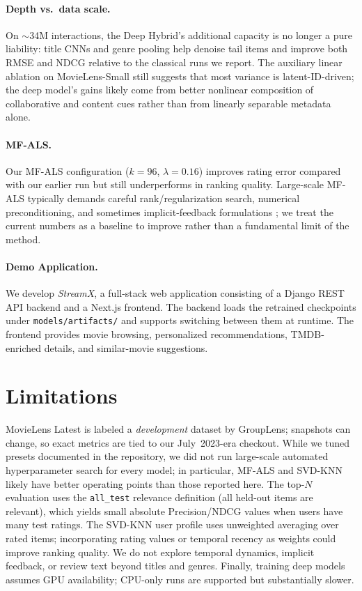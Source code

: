 \documentclass[11pt]{article}
\begin{document}
\paragraph{Depth vs.\ data scale.}
On $\sim$34M interactions, the Deep Hybrid's additional capacity is no longer a pure liability: title CNNs and genre pooling help denoise tail items and improve both RMSE and NDCG relative to the classical runs we report.
The auxiliary linear ablation on MovieLens-Small still suggests that most variance is latent-ID-driven; the deep model's gains likely come from better nonlinear composition of collaborative and content cues rather than from linearly separable metadata alone.

\paragraph{MF-ALS.}
Our MF-ALS configuration ($k{=}96$, $\lambda{=}0.16$) improves rating error compared with our earlier run but still underperforms in ranking quality.
Large-scale MF-ALS typically demands careful rank/regularization search, numerical preconditioning, and sometimes implicit-feedback formulations \cite{hu2008collaborative}; we treat the current numbers as a baseline to improve rather than a fundamental limit of the method.

\paragraph{Demo Application.}
We develop \textit{StreamX}, a full-stack web application consisting of a Django REST API backend and a Next.js frontend.
The backend loads the retrained checkpoints under \texttt{models/artifacts/} and supports switching between them at runtime.
The frontend provides movie browsing, personalized recommendations, TMDB-enriched details, and similar-movie suggestions.



\section{Limitations}

MovieLens Latest is labeled a \emph{development} dataset by GroupLens; snapshots can change, so exact metrics are tied to our July~2023-era checkout.
While we tuned presets documented in the repository, we did not run large-scale automated hyperparameter search for every model; in particular, MF-ALS and SVD-KNN likely have better operating points than those reported here.
The top-$N$ evaluation uses the \texttt{all\_test} relevance definition (all held-out items are relevant), which yields small absolute Precision/NDCG values when users have many test ratings.
The SVD-KNN user profile uses unweighted averaging over rated items; incorporating rating values or temporal recency as weights could improve ranking quality.
We do not explore temporal dynamics, implicit feedback, or review text beyond titles and genres.
Finally, training deep models assumes GPU availability; CPU-only runs are supported but substantially slower.
\end{document}
